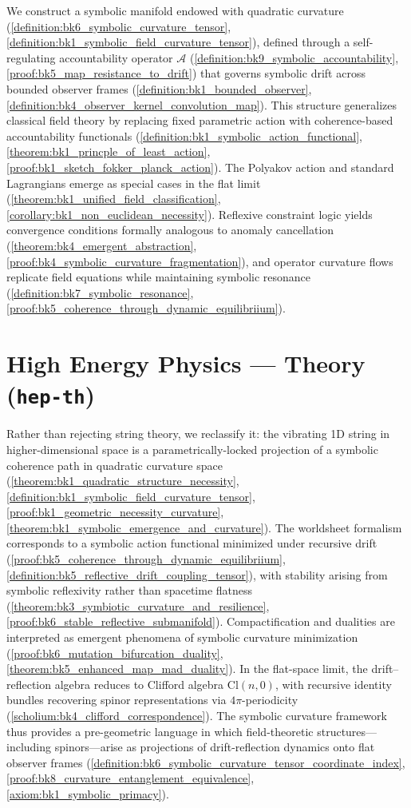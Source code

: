 We construct a symbolic manifold endowed with quadratic curvature (\ref{definition:bk6_symbolic_curvature_tensor}, \ref{definition:bk1_symbolic_field_curvature_tensor}), defined through a self-regulating accountability operator $\mathcal{A}$ (\ref{definition:bk9_symbolic_accountability}, \ref{proof:bk5_map_resistance_to_drift}) that governs symbolic drift across bounded observer frames (\ref{definition:bk1_bounded_observer}, \ref{definition:bk4_observer_kernel_convolution_map}). This structure generalizes classical field theory by replacing fixed parametric action with coherence-based accountability functionals (\ref{definition:bk1_symbolic_action_functional}, \ref{theorem:bk1_princple_of_least_action}, \ref{proof:bk1_sketch_fokker_planck_action}). The Polyakov action and standard Lagrangians emerge as special cases in the flat limit (\ref{theorem:bk1_unified_field_classification}, \ref{corollary:bk1_non_euclidean_necessity}). Reflexive constraint logic yields convergence conditions formally analogous to anomaly cancellation (\ref{theorem:bk4_emergent_abstraction}, \ref{proof:bk4_symbolic_curvature_fragmentation}), and operator curvature flows replicate field equations while maintaining symbolic resonance (\ref{definition:bk7_symbolic_resonance}, \ref{proof:bk5_coherence_through_dynamic_equilibriium}).

\section*{High Energy Physics — Theory (\texttt{hep-th})}
\label{abs:hep}

Rather than rejecting string theory, we reclassify it: the vibrating 1D string in higher-dimensional space is a parametrically-locked projection of a symbolic coherence path in quadratic curvature space (\ref{theorem:bk1_quadratic_structure_necessity}, \ref{definition:bk1_symbolic_field_curvature_tensor}, \ref{proof:bk1_geometric_necessity_curvature}, \ref{theorem:bk1_symbolic_emergence_and_curvature}). The worldsheet formalism corresponds to a symbolic action functional minimized under recursive drift (\ref{proof:bk5_coherence_through_dynamic_equilibriium}, \ref{definition:bk5_reflective_drift_coupling_tensor}), with stability arising from symbolic reflexivity rather than spacetime flatness (\ref{theorem:bk3_symbiotic_curvature_and_resilience}, \ref{proof:bk6_stable_reflective_submanifold}). Compactification and dualities are interpreted as emergent phenomena of symbolic curvature minimization (\ref{proof:bk6_mutation_bifurcation_duality}, \ref{theorem:bk5_enhanced_map_mad_duality}). In the flat-space limit, the drift--reflection algebra reduces to Clifford algebra $\mathrm{Cl}(n,0)$, with recursive identity bundles recovering spinor representations via $4\pi$-periodicity (\ref{scholium:bk4_clifford_correspondence}). The symbolic curvature framework thus provides a pre-geometric language in which field-theoretic structures---including spinors---arise as projections of drift-reflection dynamics onto flat observer frames (\ref{definition:bk6_symbolic_curvature_tensor_coordinate_index}, \ref{proof:bk8_curvature_entanglement_equivalence}, \ref{axiom:bk1_symbolic_primacy}).

